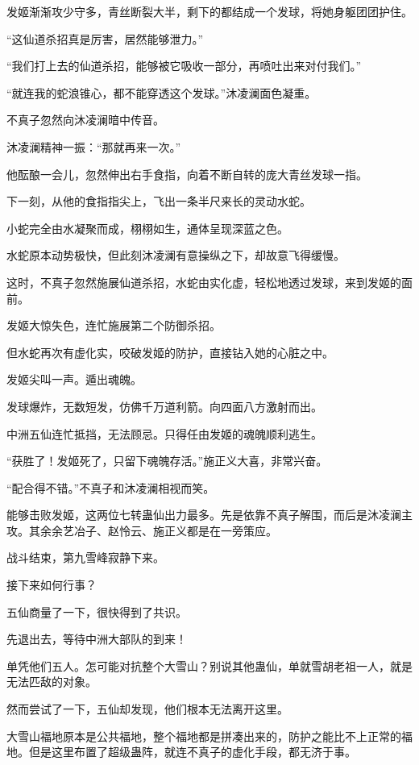 \begin{this_body}
发姬渐渐攻少守多，青丝断裂大半，剩下的都结成一个发球，将她身躯团团护住。

“这仙道杀招真是厉害，居然能够泄力。”

“我们打上去的仙道杀招，能够被它吸收一部分，再喷吐出来对付我们。”

“就连我的蛇浪锥心，都不能穿透这个发球。”沐凌澜面色凝重。

不真子忽然向沐凌澜暗中传音。

沐凌澜精神一振：“那就再来一次。”

他酝酿一会儿，忽然伸出右手食指，向着不断自转的庞大青丝发球一指。

下一刻，从他的食指指尖上，飞出一条半尺来长的灵动水蛇。

小蛇完全由水凝聚而成，栩栩如生，通体呈现深蓝之色。

水蛇原本动势极快，但此刻沐凌澜有意操纵之下，却故意飞得缓慢。

这时，不真子忽然施展仙道杀招，水蛇由实化虚，轻松地透过发球，来到发姬的面前。

发姬大惊失色，连忙施展第二个防御杀招。

但水蛇再次有虚化实，咬破发姬的防护，直接钻入她的心脏之中。

发姬尖叫一声。遁出魂魄。

发球爆炸，无数短发，仿佛千万道利箭。向四面八方激射而出。

中洲五仙连忙抵挡，无法顾忌。只得任由发姬的魂魄顺利逃生。

“获胜了！发姬死了，只留下魂魄存活。”施正义大喜，非常兴奋。

“配合得不错。”不真子和沐凌澜相视而笑。

能够击败发姬，这两位七转蛊仙出力最多。先是依靠不真子解围，而后是沐凌澜主攻。其余余艺冶子、赵怜云、施正义都是在一旁策应。

战斗结束，第九雪峰寂静下来。

接下来如何行事？

五仙商量了一下，很快得到了共识。

先退出去，等待中洲大部队的到来！

单凭他们五人。怎可能对抗整个大雪山？别说其他蛊仙，单就雪胡老祖一人，就是无法匹敌的对象。

然而尝试了一下，五仙却发现，他们根本无法离开这里。

大雪山福地原本是公共福地，整个福地都是拼凑出来的，防护之能比不上正常的福地。但是这里布置了超级蛊阵，就连不真子的虚化手段，都无济于事。


\end{this_body}
